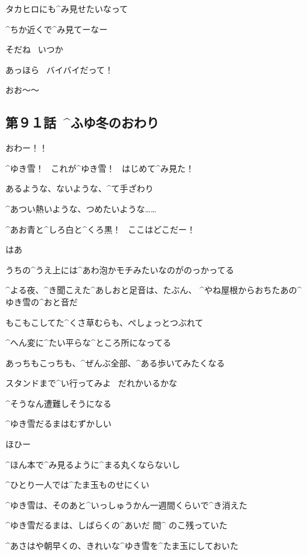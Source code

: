 \Alpha タカヒロにも^{み}{見}せたいなって

\Takahiro ^{ちか}{近}くで^{み}{見}てーなー

\Alpha そだね
\ いつか

\page[34]
\Alpha あっほら
\ バイバイだって！

\Takahiro おお〜〜


\subsection{第９１話\ ^{ふゆ}{冬}のおわり}

\page[42]
\Alpha おわー！！

\page[44]
\Alpha ^{ゆき}{雪}！
\ これが^{ゆき}{雪}！
\ はじめて^{み}{見}た！

\Alpha あるような、ないような、^{て}{手}ざわり

\Alpha ^{あつい}{熱い}ような、つめたいような……

\page[45]
\Alpha ^{あお}{青}と^{しろ}{白}と^{くろ}{黒}！
\ ここはどこだー！

\page[46]
\Alpha はあ

\page[47]
\Alpha うちの^{うえ}{上}には^{あわ}{泡}かモチみたいなのがのっかってる

\Alpha ^{よる}{夜}、^{き}{聞}こえた^{あしおと}{足音}は、たぶん、
^{やね}{屋根}からおちたあの^{ゆき}{雪}の^{おと}{音}だ

\Alpha もこもこしてた^{くさ}{草}むらも、ぺしょっとつぶれて

\Alpha ^{へん}{変}に^{たい}{平}らな^{ところ}{所}になってる

\page[48]
\Alpha あっちもこっちも、^{ぜんぶ}{全部}、^{ある}{歩}いてみたくなる

\Alpha スタンドまで^{い}{行}ってみよ
\ だれかいるかな

\Alpha ^{そうなん}{遭難}しそうになる

\page[49]
\Alpha ^{ゆき}{雪}だるまはむずかしい

\Alpha ほひー

\Alpha ^{ほん}{本}で^{み}{見}るように^{まる}{丸}くならないし

\Alpha ^{ひとり}{一人}では^{たま}{玉}ものせにくい

\page[51]
\Alpha ^{ゆき}{雪}は、そのあと^{いっしゅうかん}{一週間}くらいで^{き}{消}えた

\Alpha ^{ゆき}{雪}だるまは、しばらくの^{あいだ }{間}^{ のこ}{残}っていた

\page[52]
\Alpha ^{あさはや}{朝早}くの、きれいな^{ゆき}{雪}を^{たま}{玉}にしておいた


